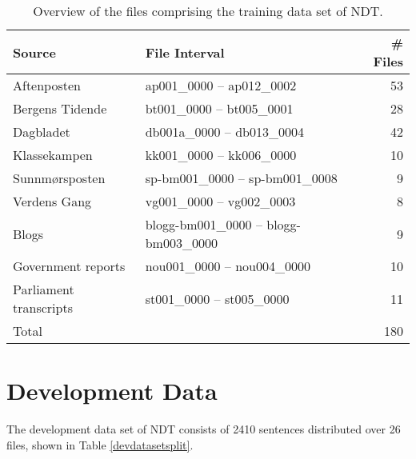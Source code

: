 \documentclass[a4paper,12pt,english]{book}
\begin{document}
\begin{appendices}
    \begin{table}
        \centering
        \smaller[0.5]
        \begin{tabular}{@{}llr@{}}
            \toprule
            \textbf{Source} & \textbf{File Interval} & \textbf{\# Files} \\
            \midrule
            Aftenposten &  ap001\_0000 -- ap012\_0002 & 53 \\
            Bergens Tidende &  bt001\_0000 -- bt005\_0001 & 28 \\
            Dagbladet &  db001a\_0000 -- db013\_0004 & 42 \\
            Klassekampen &  kk001\_0000 -- kk006\_0000 & 10 \\
            Sunnmørsposten &  sp-bm001\_0000 -- sp-bm001\_0008 & 9 \\
            Verdens Gang & vg001\_0000 -- vg002\_0003 & 8 \\
            Blogs & blogg-bm001\_0000 -- blogg-bm003\_0000 & 9 \\
            Government reports &  nou001\_0000 -- nou004\_0000 & 10 \\
            Parliament transcripts &  st001\_0000 -- st005\_0000 & 11 \\
            \midrule
            Total & & 180 \\
            \bottomrule
        \end{tabular}
        \caption{Overview of the files comprising the training data set of
            NDT.}
        \label{trainingdatasetsplit}
    \end{table}

    \section{Development Data}
    The development data set of NDT consists of 2410 sentences distributed over
    26 files, shown in Table \ref{devdatasetsplit}.


\end{appendices}
\end{document}
